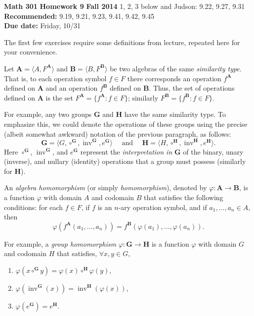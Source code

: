 \documentclass[12pt,reqno]{amsart}
\newcommand{\bA}{\ensuremath{\mathbf{A}}}
\newcommand{\bB}{\ensuremath{\mathbf{B}}}
\newcommand{\bG}{\ensuremath{\mathbf{G}}}
\newcommand{\bH}{\ensuremath{\mathbf{H}}}
\newcommand{\invG}{\ensuremath{\operatorname{inv}^{\bG}}}
\newcommand{\invH}{\ensuremath{\operatorname{inv}^{\bH}}}
\newcommand{\<}{\ensuremath{\langle}}
\renewcommand{\>}{\ensuremath{\rangle}}
\begin{document}
\thispagestyle{empty}

\noindent \textbf{Math 301} \hskip5cm {\bf Homework 9} \hfill {\bf Fall 2014}
\vskip1cm
 1, 2, 3 below and Judson: 9.22, 9.27, 9.31\\
{\bf Recommended:} 9.19, 9.21, 9.23, 9.41, 9.42, 9.45\\
{\bf Due date:} Friday, 10/31

\bigskip

\noindent The first few exercises require some definitions from lecture, 
repeated here for your convenience.

\vskip5mm

\noindent Let $\bA = \<A, F^{\bA}\>$ and $\bB = \<B, F^{\bB}\>$ be two algebras of the
same \emph{similarity type}.  That is, to each operation
symbol $f \in F$ there corresponds an operation $f^{\bA}$ defined on $\bA$ and an
operation $f^{\bB}$ defined on $\bB$.
Thus, the set of operations defined on $\bA$ is the set 
$F^{\bA} = \{f^{\bA} : f\in F\}$; similarly 
$F^{\bB} = \{f^{\bB} : f\in F\}$.

\vskip3mm

\noindent For example, any two groups $\bG$ and $\bH$ have the same similarity type. 
To emphasize this, we could denote the operations of these groups using
the precise (albeit somewhat awkward) notation of the previous paragraph, as follows:
\[
\bG  = \<G, \circ^{\bG}, \invG, e^{\bG}\> \quad \text{ and } \quad
\bH  = \<H, \circ^{\bH}, \invH, e^{\bH}\>.
\] 
Here $\circ^{\bG}$, $\invG$, and $e^{\bG}$ represent the \emph{interpretation
in} $\bG$ of the binary, unary (inverse), and  nullary (identity)
operations that a group must possess (similarly for $\bH$).  

\vskip5mm

\noindent An \emph{algebra homomorphism} (or simply \emph{homomorphism}), denoted by
$\varphi: \bA \rightarrow \bB$, is a function $\varphi$ with domain $A$ and
codomain $B$ that satisfies the following conditions: for each $f \in F$, if $f$
is an $n$-ary operation symbol, and if $a_1, \dots, a_n \in A$, then
\[
\varphi(f^{\bA}(a_1, \dots, a_n)) = f^{\bB}(\varphi(a_1), \dots, \varphi(a_n)).
\]

\vskip3mm

\noindent For example, a \emph{group homomorphism} $\varphi: \bG \rightarrow \bH$  is a function 
$\varphi$ with domain $G$ and codomain $H$ that satisfies, $\forall x, y \in G$,
\begin{enumerate}
\item  $\varphi(x\circ^{\bG} y) = \varphi(x) \circ^{\bH} \varphi(y)$,
\item  $\varphi(\invG(x)) = \invH(\varphi(x))$,
\item  $\varphi(e^{\bG}) = e^{\bH}$.
\end{enumerate}
\end{document}
